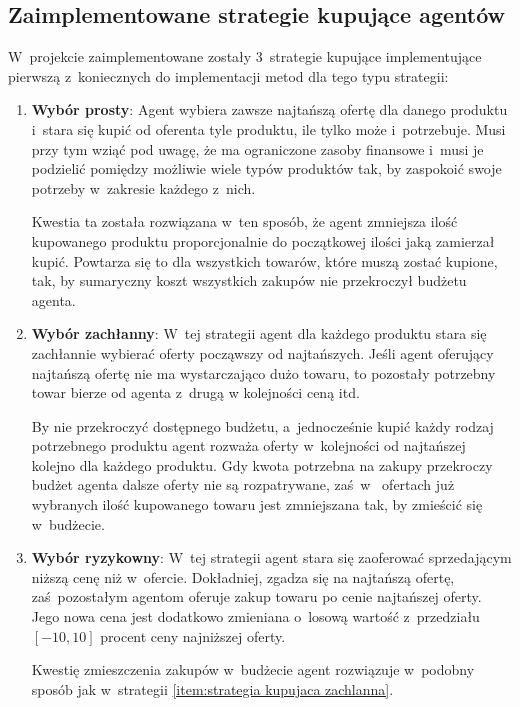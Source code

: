 \documentclass[12pt]{article}
\makeatletter
\def\namedlabel#1#2{\begingroup
   \def\@currentlabel{#2}%
   \label{#1}\endgroup
}
\makeatother
\begin{document}
\subsection{Zaimplementowane strategie kupujące agentów}
W~projekcie zaimplementowane zostały 3~strategie kupujące implementujące pierwszą z~koniecznych do implementacji metod dla tego typu strategii:
\begin{enumerate}
 \item \textbf{Wybór prosty}: Agent wybiera zawsze najtańszą ofertę dla danego produktu i~stara się kupić od oferenta tyle produktu, ile tylko może i~potrzebuje.
Musi przy tym wziąć pod uwagę, że ma ograniczone zasoby finansowe i~musi je podzielić pomiędzy możliwie wiele typów produktów tak, by zaspokoić swoje potrzeby w~zakresie każdego z~nich.

Kwestia ta została rozwiązana w~ten sposób, że agent zmniejsza ilość kupowanego produktu proporcjonalnie do początkowej ilości jaką zamierzał kupić.
Powtarza się to dla wszystkich towarów, które muszą zostać kupione, tak, by sumaryczny koszt wszystkich zakupów nie przekroczył budżetu agenta.
 \item \namedlabel{item:strategia kupujaca zachlanna}{Wybór zachłanny} \textbf{Wybór zachłanny}: W~tej strategii agent dla każdego produktu stara się zachłannie wybierać oferty począwszy od najtańszych. 
Jeśli agent oferujący najtańszą ofertę nie ma wystarczająco dużo towaru, to pozostały potrzebny towar bierze od agenta z~drugą w kolejności ceną itd.

By nie przekroczyć dostępnego budżetu, a~jednocześnie kupić każdy rodzaj potrzebnego produktu agent rozważa oferty w~kolejności od najtańszej kolejno dla każdego produktu. Gdy kwota potrzebna na zakupy
przekroczy budżet agenta dalsze oferty nie są rozpatrywane, zaś~w~ ofertach już wybranych ilość kupowanego towaru jest zmniejszana tak, by zmieścić się w~budżecie.
 
 \item \namedlabel{item:strategia kupujaca ryzykowna}{Wybór ryzykowny} \textbf{Wybór ryzykowny}: W~tej strategii agent stara się zaoferować sprzedającym niższą cenę niż w~ofercie. Dokładniej, zgadza się na najtańszą ofertę, zaś~pozostałym agentom
oferuje zakup towaru po cenie najtańszej oferty. Jego nowa cena jest dodatkowo zmieniana o~losową wartość z~przedziału $[-10, 10]$ procent ceny najniższej oferty.

Kwestię zmieszczenia zakupów w~budżecie agent rozwiązuje w~podobny sposób jak w~strategii \ref{item:strategia kupujaca zachlanna}.
\end{enumerate}
\end{document}
